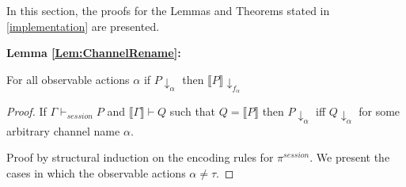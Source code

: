 
In this section, the proofs for the Lemmas and Theorems stated in \autoref{implementation} are presented.

\vspace{10pt}

\textbf{Lemma \ref{Lem:ChannelRename}:}

For all observable actions $\alpha$ if $P \downarrow_{\alpha}$ then $\llbracket P \rrbracket \downarrow_{f_\alpha}$

\begin{proof}
If $\Gamma \vdash_{session} P$ and $\llbracket \Gamma \rrbracket \vdash Q$ such that $Q = \llbracket P \rrbracket$ then $P \downarrow_\alpha$ iff $Q \downarrow_\alpha$ for some arbitrary channel name $\alpha$.

Proof by structural induction on the encoding rules for $\pi^{session}$. We present the cases in which the observable actions $\alpha \not = \tau$.


\end{proof}
